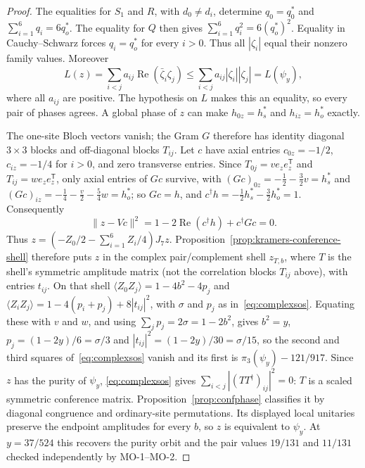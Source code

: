 \begin{proof}
The equalities for $S_1$ and $R$, with $d_0\ne d_i$, determine
$q_0=q_0^*$ and $\sum_{i=1}^6q_i=6q_o^*$.
The equality for $Q$ then gives
$\sum_{i=1}^6q_i^2=6(q_o^*)^2$.
Equality in Cauchy--Schwarz forces $q_i=q_o^*$ for every $i>0$.
Thus all $|\zeta_i|$ equal their nonzero family values.
Moreover
\[
 L(z)=\sum_{i<j}a_{ij}\operatorname{Re}(\bar\zeta_i\zeta_j)
 \le\sum_{i<j}a_{ij}|\zeta_i||\zeta_j|=L(\psi_y),
\]
where all $a_{ij}$ are positive.  The hypothesis on $L$ makes this an
equality, so every pair of phases agrees.  A global phase of $z$
can make $h_{0z}=h_s^*$ and $h_{iz}=h_o^*$ exactly.

The one-site Bloch vectors vanish; the Gram $G$ therefore has
identity diagonal $3\times3$ blocks and off-diagonal blocks $T_{ij}$.
Let $c$ have axial entries $c_{0z}=-1/2$, $c_{iz}=-1/4$ for $i>0$,
and zero transverse entries.  Since $T_{0j}=ve_ze_z^{\mathsf T}$ and $T_{ij}=we_ze_z^{\mathsf T}$, only axial entries of $Gc$ survive, with
$(Gc)_{0z}=-\tfrac12-\tfrac32v=h_s^*$ and $(Gc)_{iz}=-\tfrac14-\tfrac v2-\tfrac54w=h_o^*$; so $Gc=h$, and
$c^\dagger h=-\tfrac12h_s^*-\tfrac32h_o^*=1$.  Consequently
\[
 \|z-Vc\|^2=1-2\operatorname{Re}(c^\dagger h)
                   +c^\dagger Gc=0.
\]
Thus $z=(-Z_0/2-\sum_{i=1}^6Z_i/4)J_7z$.
Proposition~\ref{prop:kramers-conference-shell} therefore puts $z$ in the
complex pair/complement shell $z_{T,b}$, where $T$ is the shell's symmetric amplitude matrix (not the
correlation blocks $T_{ij}$ above), with entries $t_{ij}$. On that shell
$\langle Z_0Z_j\rangle=1-4b^2-4p_j$ and $\langle Z_iZ_j\rangle=1-4(p_i+p_j)+8|t_{ij}|^2$, with $\sigma$ and $p_j$ as
in~\eqref{eq:complexsos}. Equating these with $v$ and $w$, and using $\sum_jp_j=2\sigma=1-2b^2$, gives
$b^2=y$, $p_j=(1-2y)/6=\sigma/3$ and $|t_{ij}|^2=(1-2y)/30=\sigma/15$, so the second and third squares
of~\eqref{eq:complexsos} vanish and its first is $\pi_3(\psi_y)-121/917$. Since $z$ has the purity of $\psi_y$,
\eqref{eq:complexsos} gives $\sum_{i<j}|(TT^\dagger)_{ij}|^2=0$: $T$ is a scaled symmetric conference matrix.
Proposition~\ref{prop:confphase} classifies it by diagonal congruence and
ordinary-site permutations. Its displayed local unitaries preserve the
endpoint amplitudes for every $b$, so $z$ is equivalent to $\psi_y$.
At $y=37/524$ this recovers the purity orbit and the pair values
$19/131$ and $11/131$ checked independently by MO-1--MO-2.
\end{proof}

